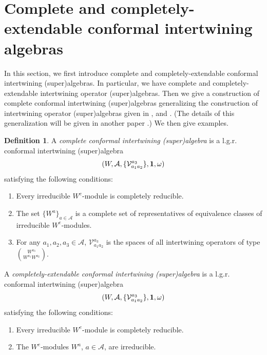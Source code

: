 \documentclass{amsproc}
\theoremstyle{definition}
\newtheorem{defn}[thm]{Definition}
\theoremstyle{remark}
\numberwithin{equation}{section}
\begin{document}
\section{Complete and completely-extendable conformal intertwining 
algebras}

In this section, we first introduce complete and completely-extendable
conformal intertwining (super)algebras. In particular, we have 
complete and completely-extendable
intertwining operator (super)algebras.
Then we give a construction
of complete conformal intertwining (super)algebras generalizing 
the construction of intertwining operator (super)algebras given in 
\cite{H1}, 
\cite{H4} and 
\cite{H6}. (The details of this generalization will be given in 
another paper \cite{H7}.) We then give examples.

\begin{defn}
{\rm A {\it complete conformal intertwining (super)algebra}
is a l.g.r. conformal intertwining (super)algebra 
$$(W, 
\mathcal{A}, \{\mathcal{V}_{a_{1}a_{2}}^{a_{3}}\}, {\bf 1}, 
\omega)$$
satisfying the following conditions:

\begin{enumerate}

\item Every irreducible 
$W^{e}$-module is completely reducible.

\item The set $\{W^{a}\}_{a\in \mathcal{A}}$
is a  complete set 
of representatives of
equivalence classes of
irreducible $W^{e}$-modules.

\item For any $a_{1}, a_{2}, a_{3}\in \mathcal{A}$, 
$\mathcal{V}_{a_{1}a_{2}}^{a_{3}}$ is the spaces of 
all intertwining operators of type $\binom{W^{a_{3}}}{
W^{a_{1}}W^{a_{2}}}$.

\end{enumerate}

A {\it completely-extendable conformal intertwining (super)algebra} 
is  a l.g.r. conformal intertwining (super)algebra
$$(W, 
\mathcal{A}, \{\mathcal{V}_{a_{1}a_{2}}^{a_{3}}\}, {\bf 1}, 
\omega)$$
satisfying the following conditions:

\begin{enumerate}

\item Every irreducible 
$W^{e}$-module is completely reducible.

\item The $W^{e}$-modules $W^{a}$, $a\in \mathcal{A}$,
are irreducible.


\end{enumerate}}
\end{defn}
\end{document}
